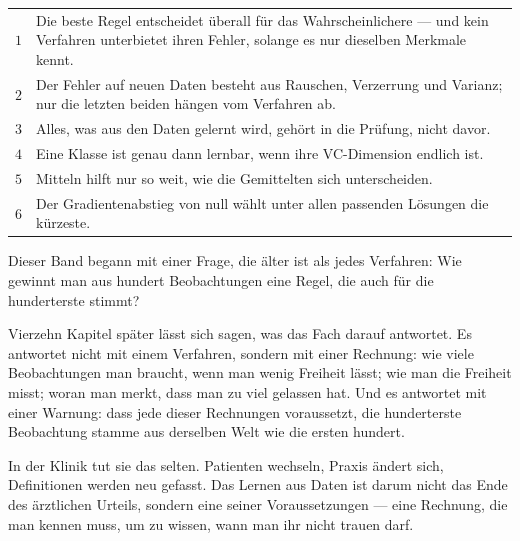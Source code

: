 \begin{merksatz}
\begin{center}
{\small
\renewcommand{\arraystretch}{1.55}
\begin{tabular}{@{}P{0.7cm}P{7.7cm}@{}}
\toprule
$1$ & Die beste Regel entscheidet überall für das Wahrscheinlichere --- und kein Verfahren unterbietet ihren Fehler, solange es nur dieselben Merkmale kennt.\\
$2$ & Der Fehler auf neuen Daten besteht aus Rauschen, Verzerrung und Varianz; nur die letzten beiden hängen vom Verfahren ab.\\
$3$ & Alles, was aus den Daten gelernt wird, gehört in die Prüfung, nicht davor.\\
$4$ & Eine Klasse ist genau dann lernbar, wenn ihre VC-Dimension endlich ist.\\
$5$ & Mitteln hilft nur so weit, wie die Gemittelten sich unterscheiden.\\
$6$ & Der Gradientenabstieg von null wählt unter allen passenden Lösungen die kürzeste.\\
\bottomrule
\end{tabular}}
\end{center}
\end{merksatz}

\begin{merksatz}
\begin{center}
\begin{minipage}{0.9\textwidth}
Dieser Band begann mit einer Frage, die älter ist als jedes Verfahren: Wie gewinnt man aus hundert Beobachtungen eine Regel, die auch für die hunderterste stimmt?

Vierzehn Kapitel später lässt sich sagen, was das Fach darauf antwortet. Es antwortet nicht mit einem Verfahren, sondern mit einer Rechnung: wie viele Beobachtungen man braucht, wenn man wenig Freiheit lässt; wie man die Freiheit misst; woran man merkt, dass man zu viel gelassen hat. Und es antwortet mit einer Warnung: dass jede dieser Rechnungen voraussetzt, die hunderterste Beobachtung stamme aus derselben Welt wie die ersten hundert.

In der Klinik tut sie das selten. Patienten wechseln, Praxis ändert sich, Definitionen werden neu gefasst. Das Lernen aus Daten ist darum nicht das Ende des ärztlichen Urteils, sondern eine seiner Voraussetzungen --- eine Rechnung, die man kennen muss, um zu wissen, wann man ihr nicht trauen darf.
\end{minipage}
\end{center}

\begin{center}
\begin{minipage}{0.88\textwidth}
\end{minipage}
\end{center}
\end{merksatz}
